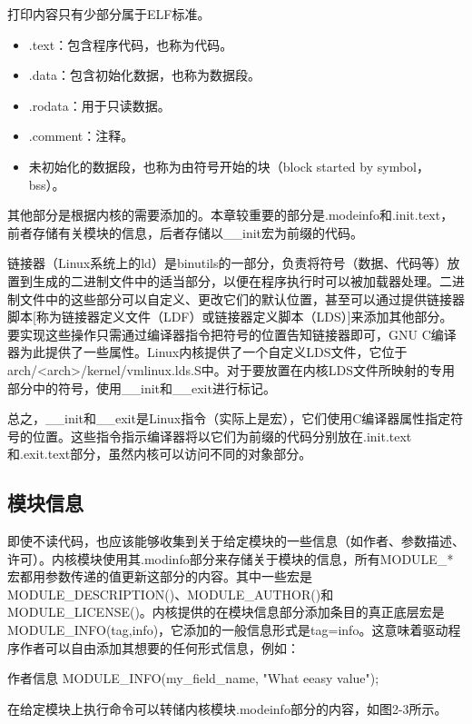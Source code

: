 \documentclass[lang=cn,newtx,10pt,scheme=chinese]{elegantbook}
\begin{document}
打印内容只有少部分属于ELF标准。

\begin{itemize}
\item .text：包含程序代码，也称为代码。
\item .data：包含初始化数据，也称为数据段。
\item .rodata：用于只读数据。
\item .comment：注释。
\item 未初始化的数据段，也称为由符号开始的块（block started by symbol，bss）。
\end{itemize}

其他部分是根据内核的需要添加的。本章较重要的部分是.modeinfo和.init.text，前者存储有关模块的信息，后者存储以\_\_init宏为前缀的代码。

链接器（Linux系统上的ld）是binutils的一部分，负责将符号（数据、代码等）放置到生成的二进制文件中的适当部分，以便在程序执行时可以被加载器处理。二进制文件中的这些部分可以自定义、更改它们的默认位置，甚至可以通过提供链接器脚本[称为链接器定义文件（LDF）或链接器定义脚本（LDS）]来添加其他部分。要实现这些操作只需通过编译器指令把符号的位置告知链接器即可，GNU C编译器为此提供了一些属性。Linux内核提供了一个自定义LDS文件，它位于arch/<arch>/kernel/vmlinux.lds.S中。对于要放置在内核LDS文件所映射的专用部分中的符号，使用\_\_init和\_\_exit进行标记。

总之，\_\_init和\_\_exit是Linux指令（实际上是宏），它们使用C编译器属性指定符号的位置。这些指令指示编译器将以它们为前缀的代码分别放在.init.text和.exit.text部分，虽然内核可以访问不同的对象部分。

\subsection{模块信息}

即使不读代码，也应该能够收集到关于给定模块的一些信息（如作者、参数描述、许可）。内核模块使用其.modinfo部分来存储关于模块的信息，所有MODULE\_*宏都用参数传递的值更新这部分的内容。其中一些宏是MODULE\_DESCRIPTION()、MODULE\_AUTHOR()和MODULE\_LICENSE()。内核提供的在模块信息部分添加条目的真正底层宏是MODULE\_INFO(tag,info)，它添加的一般信息形式是tag=info。这意味着驱动程序作者可以自由添加其想要的任何形式信息，例如：

\begin{mycode}{作者信息}
MODULE_INFO(my_field_name, "What eeasy value");
\end{mycode}

在给定模块上执行命令可以转储内核模块.modeinfo部分的内容，如图2-3所示。
\end{document}
